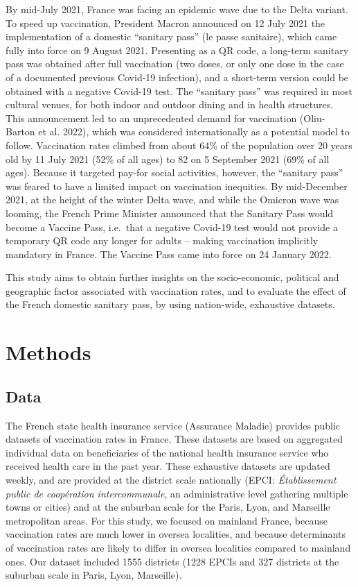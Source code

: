 \documentclass[
]{article}
\begin{document}
By mid-July 2021, France was facing an epidemic wave due to the Delta variant. To speed up vaccination, President Macron announced on 12 July 2021 the implementation of a domestic ``sanitary pass'' (le passe sanitaire), which came fully into force on 9 August 2021. Presenting as a QR code, a long-term sanitary pass was obtained after full vaccination (two doses, or only one dose in the case of a documented previous Covid-19 infection), and a short-term version could be obtained with a negative Covid-19 test.
The ``sanitary pass'' was required in most cultural venues, for both indoor and outdoor dining and in health structures. This announcement led to an unprecedented demand for vaccination (Oliu-Barton et al. 2022), which was considered internationally as a potential model to follow. Vaccination rates climbed from about 64\% of the population over 20 years old by 11 July 2021 (52\% of all ages) to 82 on 5 September 2021 (69\% of all ages). Because it targeted pay-for social activities, however, the ``sanitary pass'' was feared to have a limited impact on vaccination inequities. By mid-December 2021, at the height of the winter Delta wave, and while the Omicron wave was looming, the French Prime Minister announced that the Sanitary Pass would become a Vaccine Pass, i.e.~that a negative Covid-19 test would not provide a temporary QR code any longer for adults -- making vaccination implicitly mandatory in France. The Vaccine Pass came into force on 24 January 2022.

This study aims to obtain further insights on the socio-economic, political and geographic factor associated with vaccination rates, and to evaluate the effect of the French domestic sanitary pass, by using nation-wide, exhaustive datasets.

\hypertarget{methods}{%
\section{Methods}\label{methods}}

\hypertarget{data}{%
\subsection{Data}\label{data}}

The French state health insurance service (Assurance Maladie) provides public datasets of vaccination rates in France. These datasets are based on aggregated individual data on beneficiaries of the national health insurance service who received health care in the past year. These exhaustive datasets are updated weekly, and are provided at the district scale nationally (EPCI: \emph{Établissement public de coopération intercommunale}, an administrative level gathering multiple towns or cities) and at the suburban scale for the Paris, Lyon, and Marseille metropolitan areas. For this study, we focused on mainland France, because vaccination rates are much lower in oversea localities, and because determinants of vaccination rates are likely to differ in oversea localities compared to mainland ones. Our dataset included 1555 districts (1228 EPCIs and 327 districts at the suburban scale in Paris, Lyon, Marseille).
\end{document}
